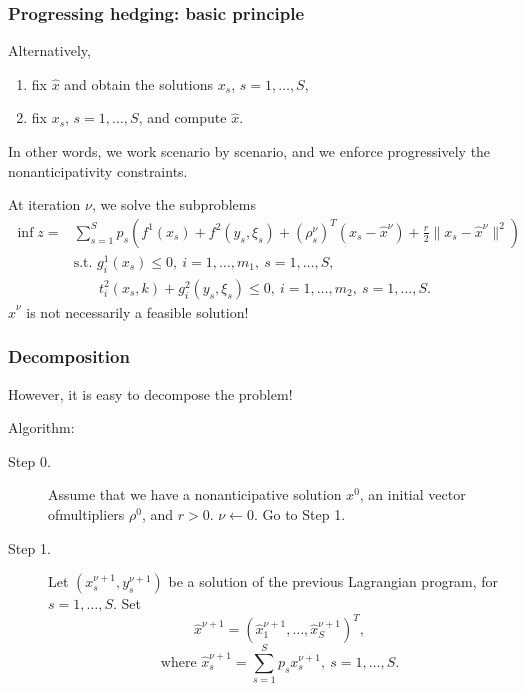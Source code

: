 \documentclass[french]{beamer}
\begin{document}
\begin{frame}
\frametitle{Progressing hedging: basic principle}

Alternatively,
\begin{enumerate}
\item
fix $\hat{x}$ and obtain the solutions $x_s$, $s = 1,\ldots,S$,
\item
fix $x_s$, $s = 1,\ldots,S$, and compute $\hat{x}$.
\end{enumerate}
In other words, we work scenario by scenario, and we enforce progressively the nonanticipativity constraints.

\mbox{}

At iteration $\nu$, we solve the subproblems
\begin{align*}
\inf z = & \sum_{s=1}^S p_s\left( f^1(x_s) + f^2\left(y_s,\xi_s\right) +
\left(\rho_s^{\nu}\right)^T\left(x_s-\hat{x}^{\nu}\right)+\frac{r}{2}\|
x_s-\hat{x}^{\nu} \|^2\right) \\
& \text{s.t. } g_i^1(x_s) \leq 0,\ i=1,\ldots{},m_1,\ s=1,\ldots{},S,\\
& \phantom{\text{t.q. }}
t_i^2\left(x_s,k\right)+g_i^2\left(y_s,\xi_s\right) \leq 0,\
i=1,\ldots{},m_2,\ s=1,\ldots{},S.
\end{align*}
$\hat{x}^{\nu}$ is not necessarily a feasible solution!

\end{frame}

\begin{frame}
\frametitle{Decomposition}

However, it is easy to decompose the problem!

Algorithm:
\begin{description}
\item[Step 0.]
Assume that we have a nonanticipative solution $x^0$, an initial vector ofmultipliers $\rho^0$, and $r > 0$.
  $\nu \leftarrow 0$. Go to Step 1.
\item[Step 1.]
Let $\left(x_s^{\nu+1}, y_s^{\nu+1}\right)$ be a solution of the previous Lagrangian program, for $s=1,\ldots{},S$. Set
\[
\hat{x}^{\nu+1} = \left( \hat{x}_1^{\nu+1}, \ldots{}, \hat{x}_S^{\nu+1}\right)^T,
\]
\[
\mbox{where } \hat{x}_s^{\nu+1} = \sum_{s=1}^S p_s x_s^{\nu+1},\ s=1,\ldots,S.
\]
\end{description}

\end{frame}
\end{document}

